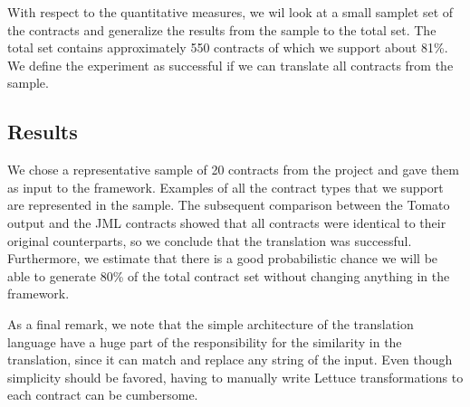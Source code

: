With respect to the quantitative measures, we wil look at a small samplet set of the contracts and generalize the results from the sample to the total set. The total set contains approximately 550 contracts of which we support about 81\%. We define the experiment as successful if we can translate all contracts from the sample.

\subsection{Results}

We chose a representative sample of 20 contracts from the project and gave them as input to the framework. Examples of all the contract types that we support are represented in the sample. The subsequent comparison between the Tomato output and the JML contracts showed that all contracts were identical to their original counterparts, so we conclude that the translation was successful. Furthermore, we estimate that there is a good probabilistic chance we will be able to generate 80\% of the total contract set without changing anything in the framework.
	
As a final remark, we note that the simple architecture of the translation language have a huge part of the responsibility for the similarity in the translation, since it can match and replace any string of the input. Even though simplicity should be favored, having to manually write Lettuce transformations to each contract can be cumbersome.





